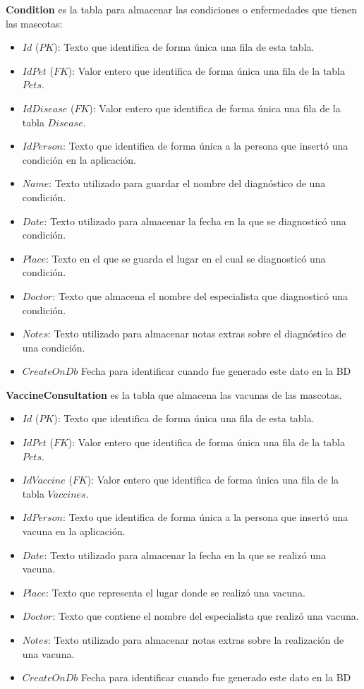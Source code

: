 \textbf{Condition} es la tabla para almacenar las condiciones o enfermedades que tienen las mascotas:

\begin{itemize}
	\item	$Id$ ($PK$): Texto que identifica de forma única una fila de esta tabla.
	\item	$IdPet$ ($FK$): Valor entero que identifica de forma única una fila de la tabla $Pets$.
	\item	$IdDisease$ ($FK$): Valor entero que identifica de forma única una fila de la tabla $Disease$.
	\item	$IdPerson$: Texto que identifica de forma única a la persona que insertó una condición en la aplicación.
	\item	$Name$: Texto utilizado para guardar el nombre del diagnóstico de una condición.
	\item	$Date$: Texto utilizado para almacenar la fecha en la que se diagnosticó una condición.
	\item	$Place$: Texto en el que se guarda el lugar en el cual se diagnosticó una condición.
	\item	$Doctor$: Texto que almacena el nombre del especialista que diagnosticó una condición.
	\item	$Notes$: Texto utilizado para almacenar notas extras sobre el diagnóstico de una condición.
		\item	$CreateOnDb$ 
	Fecha para identificar cuando fue generado este dato en la BD
\end{itemize}

\textbf{VaccineConsultation} es la tabla que almacena las vacunas de las mascotas.

\begin{itemize}
	\item	$Id$ ($PK$): Texto que identifica de forma única una fila de esta tabla.
	\item	$IdPet$ ($FK$): Valor entero que identifica de forma única una fila de la tabla $Pets$.
	\item	$IdVaccine$ ($FK$): Valor entero que identifica de forma única una fila de la tabla $Vaccines$.
	\item	$IdPerson$: Texto que identifica de forma única a la persona que insertó una vacuna en la aplicación.
	\item	$Date$: Texto utilizado para almacenar la fecha en la que se realizó una vacuna.
	\item	$Place$: Texto que representa el lugar donde se realizó una vacuna.
	\item	$Doctor$: Texto que contiene el nombre del especialista que realizó una vacuna.
	\item	$Notes$: Texto utilizado para almacenar notas extras sobre la realización de una vacuna.
		\item	$CreateOnDb$ 
	Fecha para identificar cuando fue generado este dato en la BD
\end{itemize}



